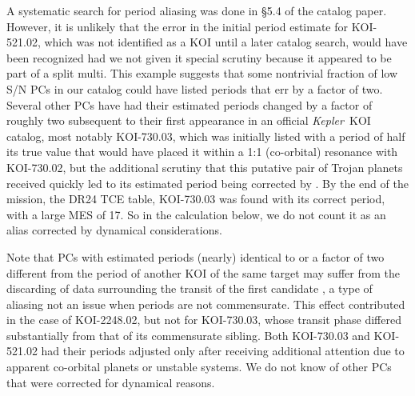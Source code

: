 \documentclass{aastex62}
\newcommand{\ik}{{\it Kepler~}}
\begin{document}
A systematic search for period aliasing was done in \S5.4 of the \cite{Batalha:2013} catalog paper. However, it is unlikely that the error in the initial period estimate for KOI-521.02, which was not identified as a KOI until a later catalog search, would have been recognized had we not given it special scrutiny because it appeared to be part of a split multi. This example suggests that some nontrivial fraction of low S/N PCs in our catalog could have listed periods that err by a factor of two. Several other PCs have had their estimated periods changed by a factor of roughly two subsequent to their first appearance in an official \ik KOI catalog, most notably KOI-730.03, which was initially listed with a period of half its true value \citep{Borucki:2011b} that would have placed it within a 1:1 (co-orbital) resonance with KOI-730.02, but the additional scrutiny that this putative pair of Trojan planets received quickly led to its estimated period being corrected by \cite{Lissauer:2011b}.  By the end of the mission, the DR24 TCE table, KOI-730.03 was found with its correct period, with a large MES of 17. So in the calculation below, we do not count it as an alias corrected by dynamical considerations. 

Note that PCs with estimated periods (nearly) identical to or a factor of two different from the period of another KOI of the same target may suffer from the discarding of data surrounding the transit of the first candidate \citep{Schmitt:2017}, a type of aliasing not an issue when periods are not commensurate.  This effect contributed in the case of KOI-2248.02, but not for KOI-730.03, whose transit phase differed substantially from that of its commensurate sibling.  Both KOI-730.03 and KOI-521.02 had their periods adjusted only after receiving additional attention due to apparent co-orbital planets or unstable systems. We do not know of other PCs that were corrected for dynamical reasons.
\end{document}
